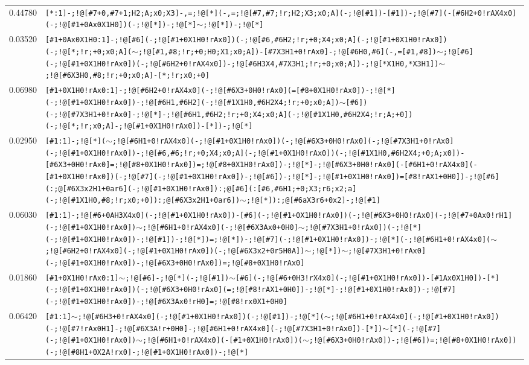 \begin{longtable}{>{\baselineskip=10pt}p{} >{\baselineskip=10pt}p{}}
0.44780 & \texttt{[*:1]-;!@[\#7+0,\#7+1;H2;A;x0;X3]-,=;!@[*](-,=;!@[\#7,\#7;!r;H2;X3;x0;A](-;!@[\#1])-[\#1])-;!@[\#7](-[\#6H2+0!rAX4x0](-;!@[\#1+0Ax0X1H0])(-;!@[*])-;!@[*]$\sim$;!@[*])-;!@[*]} \\ 
0.03520 & \texttt{[\#1+0Ax0X1H0:1]-;!@[\#6](-;!@[\#1+0X1H0!rAx0])(-;!@[\#6,\#6H2;!r;+0;X4;x0;A](-;!@[\#1+0X1H0!rAx0])(-;!@[*;!r;+0;x0;A]($\sim$;!@[\#1,\#8;!r;+0;H0;X1;x0;A])-[\#7X3H1+0!rAx0]-;!@[\#6H0,\#6](-,=[\#1,\#8])$\sim$;!@[\#6](-;!@[\#1+0X1H0!rAx0])(-;!@[\#6H2+0!rAX4x0])-;!@[\#6H3X4,\#7X3H1;!r;+0;x0;A])-;!@[*X1H0,*X3H1])$\sim$;!@[\#6X3H0,\#8;!r;+0;x0;A]-[*;!r;x0;+0]} \\ 
0.06980 & \texttt{[\#1+0X1H0!rAx0:1]-;!@[\#6H2+0!rAX4x0](-;!@[\#6X3+0H0!rAx0](=[\#8+0X1H0!rAx0])-;!@[*](-;!@[\#1+0X1H0!rAx0])-;!@[\#6H1,\#6H2](-;!@[\#1X1H0,\#6H2X4;!r;+0;x0;A])$\sim$[\#6])(-;!@[\#7X3H1+0!rAx0]-;!@[*]-;!@[\#6H1,\#6H2;!r;+0;X4;x0;A](-;!@[\#1X1H0,\#6H2X4;!r;A;+0])(-;!@[*;!r;x0;A]-;!@[\#1+0X1H0!rAx0])-[*])-;!@[*]} \\ 
0.02950 & \texttt{[\#1:1]-;!@[*]($\sim$;!@[\#6H1+0!rAX4x0](-;!@[\#1+0X1H0!rAx0])(-;!@[\#6X3+0H0!rAx0](-;!@[\#7X3H1+0!rAx0](-;!@[\#1+0X1H0!rAx0])-;!@[\#6,\#6;!r;+0;X4;x0;A](-;!@[\#1+0X1H0!rAx0])(-;!@[\#1X1H0,\#6H2X4;+0;A;x0])-[\#6X3+0H0!rAx0]=;!@[\#8+0X1H0!rAx0])=;!@[\#8+0X1H0!rAx0])-;!@[*]-;!@[\#6X3+0H0!rAx0](-[\#6H1+0!rAX4x0](-[\#1+0X1H0!rAx0])(-;!@[\#7](-;!@[\#1+0X1H0!rAx0])-;!@[\#6])-;!@[*]-;!@[\#1+0X1H0!rAx0])=[\#8!rAX1+0H0])-;!@[\#6](:;@[\#6X3x2H1+0ar6](-;!@[\#1+0X1H0!rAx0]):;@[\#6](:[\#6,\#6H1;+0;X3;r6;x2;a](-;!@[\#1X1H0,\#8;!r;x0;+0]):;@[\#6X3x2H1+0ar6])$\sim$;!@[*]):;@[\#6aX3r6+0x2]-;!@[\#1]} \\ 
0.06030 & \texttt{[\#1:1]-;!@[\#6+0AH3X4x0](-;!@[\#1+0X1H0!rAx0])-[\#6](-;!@[\#1+0X1H0!rAx0])(-;!@[\#6X3+0H0!rAx0](-;!@[\#7+0Ax0!rH1](-;!@[\#1+0X1H0!rAx0])$\sim$;!@[\#6H1+0!rAX4x0](-;!@[\#6X3Ax0+0H0]$\sim$;!@[\#7X3H1+0!rAx0])(-;!@[*](-;!@[\#1+0X1H0!rAx0])-;!@[\#1])-;!@[*])=;!@[*])-;!@[\#7](-;!@[\#1+0X1H0!rAx0])-;!@[*](-;!@[\#6H1+0!rAX4x0]($\sim$;!@[\#6H2+0!rAX4x0](-;!@[\#1+0X1H0!rAx0])(-;!@[\#6X3x2+0r5H0A])$\sim$;!@[*])$\sim$;!@[\#7X3H1+0!rAx0](-;!@[\#1+0X1H0!rAx0])-;!@[\#6X3+0H0!rAx0])=;!@[\#8+0X1H0!rAx0]} \\ 
0.01860 & \texttt{[\#1+0X1H0!rAx0:1]$\sim$;!@[\#6]-;!@[*](-;!@[\#1])$\sim$[\#6](-;!@[\#6+0H3!rX4x0](-;!@[\#1+0X1H0!rAx0])-[\#1Ax0X1H0])-[*](-;!@[\#1+0X1H0!rAx0])(-;!@[\#6X3+0H0!rAx0](=;!@[\#8!rAX1+0H0])-;!@[*]-;!@[\#1+0X1H0!rAx0])-;!@[\#7](-;!@[\#1+0X1H0!rAx0])-;!@[\#6X3Ax0!rH0]=;!@[\#8!rx0X1+0H0]} \\ 
0.06420 & \texttt{[\#1:1]$\sim$;!@[\#6H3+0!rAX4x0](-;!@[\#1+0X1H0!rAx0])(-;!@[\#1])-;!@[*]($\sim$;!@[\#6H1+0!rAX4x0](-;!@[\#1+0X1H0!rAx0])(-;!@[\#7!rAx0H1]-;!@[\#6X3A!r+0H0]-;!@[\#6H1+0!rAX4x0](-;!@[\#7X3H1+0!rAx0])-[*])$\sim$[*](-;!@[\#7](-;!@[\#1+0X1H0!rAx0])$\sim$;!@[\#6H1+0!rAX4x0](-[\#1+0X1H0!rAx0])($\sim$;!@[\#6X3+0H0!rAx0])-;!@[\#6])=;!@[\#8+0X1H0!rAx0])(-;!@[\#8H1+0X2A!rx0]-;!@[\#1+0X1H0!rAx0])-;!@[*]} \\ 

\end{longtable}
